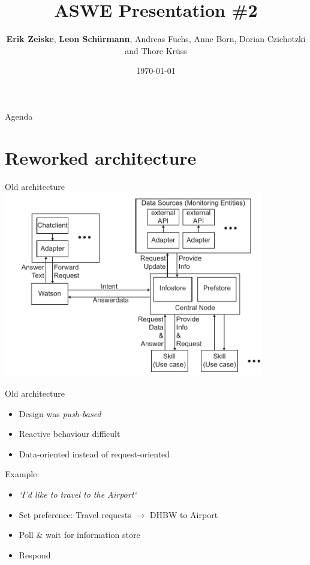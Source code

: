 \documentclass[10pt]{beamer}
\title{ASWE Presentation \#2}
\subtitle{}
\date{\today}
\author{\textbf{Erik Zeiske}, \textbf{Leon Schürmann}, Andreas Fuchs, Anne Born, Dorian Czichotzki and Thore Krüss}
\begin{document}
\maketitle

\begin{frame}{Agenda}
  \tableofcontents
\end{frame}

\section{Reworked architecture}

\begin{frame}{Old architecture}
  \includegraphics[width=0.85\textwidth]{architecture_old}
\end{frame}

\begin{frame}{Old architecture}
  \begin{itemize}
    \item Design was \textit{push-based}
    \item Reactive behaviour difficult
    \item Data-oriented instead of request-oriented
  \end{itemize}
  Example:
  \begin{itemize}
    \item \textit{`I'd like to travel to the Airport`}
    \item Set preference: Travel requests $\rightarrow$ DHBW to Airport
    \item Poll \& wait for information store
    \item Respond 
  \end{itemize}
\end{frame}
\end{document}
